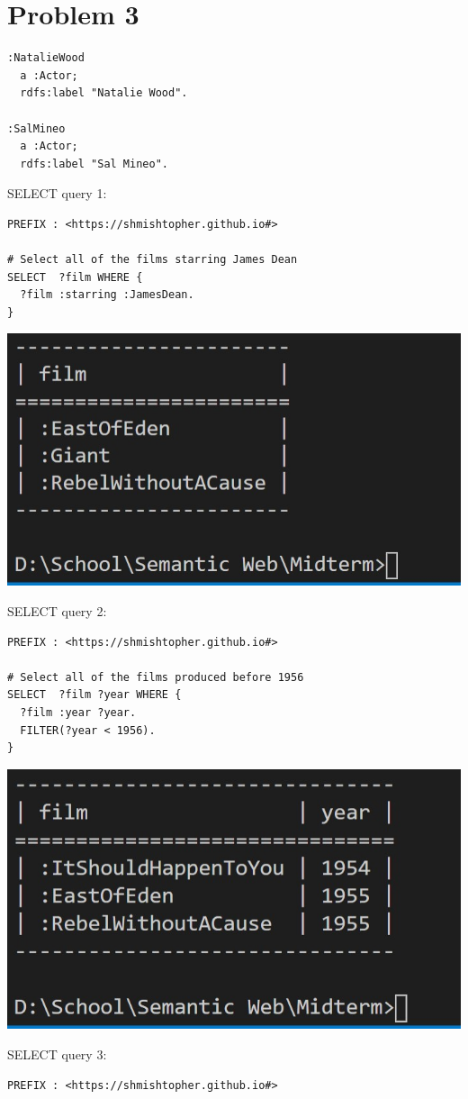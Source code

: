 \documentclass{article}
\newenvironment{problem}[1]{
  \nobreak\section*{Problem #1}
}{}
\begin{document}
\begin{problem}{3}
\begin{verbatim}
:NatalieWood
  a :Actor;
  rdfs:label "Natalie Wood".

:SalMineo
  a :Actor;
  rdfs:label "Sal Mineo".
    \end{verbatim}

    \pagebreak
    SELECT query 1:
    \begin{verbatim}
PREFIX : <https://shmishtopher.github.io#>

# Select all of the films starring James Dean
SELECT  ?film WHERE {
  ?film :starring :JamesDean.
}
    \end{verbatim}
    \includegraphics{images/4.jpg}

    SELECT query 2:
    \begin{verbatim}
PREFIX : <https://shmishtopher.github.io#>

# Select all of the films produced before 1956
SELECT  ?film ?year WHERE {
  ?film :year ?year.
  FILTER(?year < 1956).
}
    \end{verbatim}
    \includegraphics{images/5.jpg}

    \pagebreak
    SELECT query 3:
    \begin{verbatim}
PREFIX : <https://shmishtopher.github.io#>


\end{verbatim}
\end{problem}
\end{document}
